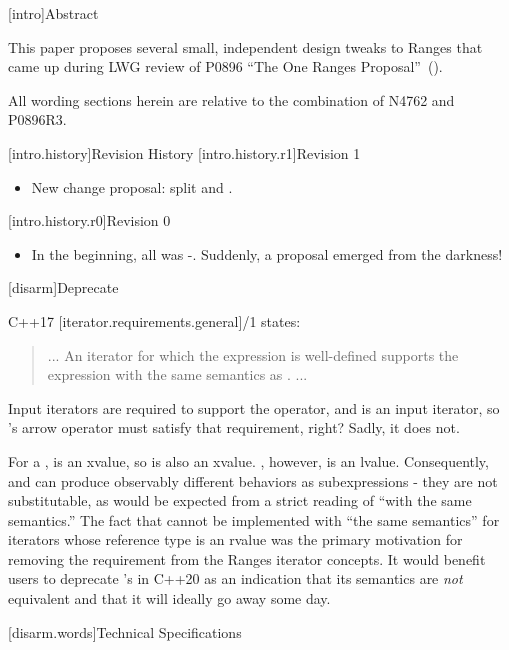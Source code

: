 [intro]{Abstract}

This paper proposes several small, independent design tweaks to Ranges that came
up during LWG review of P0896 ``The One Ranges Proposal''~(\cite{P0896}).

All wording sections herein are relative to the combination of N4762 and P0896R3.

[intro.history]{Revision History}
[intro.history.r1]{Revision 1}
\begin{itemize}
\item New change proposal: split  and .
\end{itemize}
[intro.history.r0]{Revision 0}
\begin{itemize}
\item In the beginning, all was \cv-. Suddenly, a proposal emerged
  from the darkness!
\end{itemize}

[disarm]{Deprecate }

C++17 [iterator.requirements.general]/1 states:
\begin{quote}
... An iterator  for which the expression  is well-defined
supports the expression  with the same semantics as . ...
\end{quote}
Input iterators are required to support the \tcode{->}
operator,
and  is an input iterator,
so 's arrow operator must satisfy that requirement, right?
Sadly, it does not.

For a ,  is an xvalue, so  is also
an xvalue. , however, is an lvalue. Consequently,  and
 can produce observably different behaviors as subexpressions - they
are not substitutable, as would be expected from a strict reading of ``with the
same semantics.'' The fact that \tcode{->} cannot be implemented with ``the same
semantics'' for iterators whose reference type is an rvalue was the primary
motivation for removing the \tcode{->} requirement from the Ranges iterator
concepts. It would benefit users to deprecate 's
 in C++20 as an indication that its semantics are \textit{not}
equivalent and that it will ideally go away some day.

[disarm.words]{Technical Specifications}

